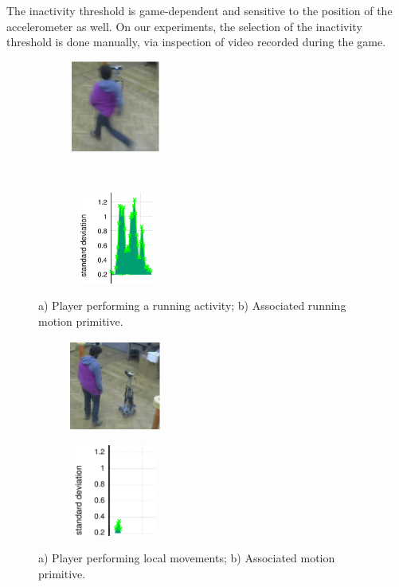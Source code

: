 The inactivity threshold is game-dependent and sensitive to the position of the accelerometer as well. On our experiments, the selection of the inactivity threshold is done manually, via inspection of video recorded during the game.

\begin{figure}[H]
    \centering
    \begin{subfigure}[b]{0.3\textwidth}
     	\centering
        \includegraphics[width=3cm,height=3cm]{images/04-activity/enricorun.png}
        \caption{}
	\end{subfigure}
	~
    \begin{subfigure}[b]{0.3\textwidth}
     	\centering
        \includegraphics[width=3cm,height=3cm]{images/04-activity/run1.png}
        \caption{}
	\end{subfigure}
	\caption{a) Player performing a running activity;  b) Associated running motion primitive.}\label{fig:running}
\end{figure}

\begin{figure}[H]
  \centering
  \begin{subfigure}[b]{0.3\textwidth}
  	 \centering
      \includegraphics[width=3cm,height=3cm]{images/04-activity/enricostill.png}
      \caption{}
  \end{subfigure}
  \begin{subfigure}[b]{0.3\textwidth}
  	 \centering
      \includegraphics[width=3cm,height=3cm]{images/04-activity/still.png}
      \caption{}
  \end{subfigure}
  \caption{a) Player performing local movements; b) Associated motion primitive.}    
  \label{fig:localmov}
\end{figure}
    
